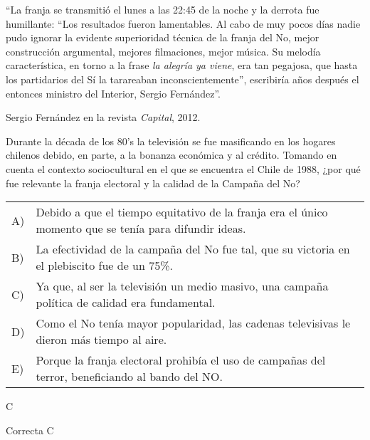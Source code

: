 \documentclass[letterpaper,11pt]{article}
\newcommand{\anchopregunta}{0.9\textwidth}
\begin{document}
\begin{enumerate}
\begin{minipage}{\anchopregunta}
\item ``La franja se transmitió el lunes a las 22:45 de la noche y la derrota fue humillante: ``Los resultados fueron lamentables. Al cabo de muy pocos días nadie pudo ignorar la evidente superioridad técnica de la franja del No, mejor construcción argumental, mejores filmaciones, mejor música. Su melodía característica, en torno a la frase \textit{la alegría ya viene}, era tan pegajosa, que hasta los partidarios del Sí la tarareaban inconscientemente'', escribiría años después el entonces ministro del Interior, Sergio Fernández''.\\
\begin{flushright}
Sergio Fernández en la revista \textit{Capital}, 2012.
\end{flushright}
Durante la década de los 80's la televisión se fue masificando en los hogares chilenos debido, en parte, a la bonanza económica y al crédito. Tomando en cuenta el contexto sociocultural en el que se encuentra el Chile de 1988, ¿por qué fue relevante la franja electoral y la calidad de la Campaña del No?
\begin{flushleft}\begin{tabular}{@{\hspace{-.001\textwidth}}l@{\hspace{2pt}}p{}}
A)& Debido a que el tiempo equitativo de la franja era el único momento que se tenía para difundir ideas.\\
B)& La efectividad de la campaña del No fue tal, que su victoria en el plebiscito fue de un 75\%.\\
C)& Ya que, al ser la televisión un medio masivo, una campaña política de calidad era fundamental.\\
D)& Como el No tenía mayor popularidad, las cadenas televisivas le dieron más tiempo al aire.\\
E)& Porque la franja electoral prohibía el uso de campañas del terror, beneficiando al bando del NO.\\ 
\end{tabular}\end{flushleft}%
\begin{key} C
\end{key} 
\begin{hint}
\end{hint}
\begin{answer} Correcta C\\
\end{answer}

\end{minipage}
\end{enumerate}
\end{document}
